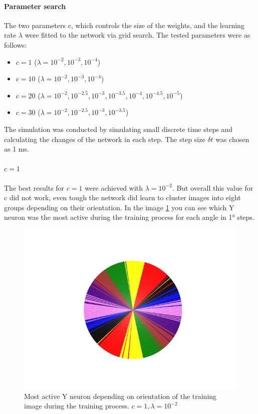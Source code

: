 \paragraph{Parameter search}
The two parameters c, which controls the size of the weights, and the learning rate $\lambda$ were fitted to the network via grid search.	The tested parameters were as follows:
\begin{itemize}
  \item $c = 1$ ($\lambda = 10^{-2}, 10^{-3}, 10^{-4}$) 
  \item $c = 10$ ($\lambda = 10^{-2}, 10^{-3}, 10^{-4}$) 
  \item $c = 20$ ($\lambda = 10^{-2}, 10^{-2.5}, 10^{-3}, 10^{-3.5},  10^{-4}, 10^{-4.5}, 10^{-5}$) 
  \item $c = 30$ ($\lambda = 10^{-2}, 10^{-2.5}, 10^{-3}, 10^{-3.5}$) 
\end{itemize}
The simulation was conducted by simulating small discrete time steps and calculating the changes of the network in each step. The step size $\delta t$ was chosen as 1 ms.

\paragraph{$c = 1$}
The best results for $c = 1$ were achieved with $\lambda = 10^{-2}$. But overall this value for c did not work, even tough the network did learn to cluster images into eight groups depending on their orientation. In the image \ref{fig:c1Pie} you can see which Y neuron was the most active during the training process for each angle in 1° steps.

\begin{figure}
  \includegraphics[width=\linewidth]{figures/angleNetwork/c1Pie.png}
  \caption{Most active Y neuron depending on orientation of the training image during the training process. $c = 1, \lambda = 10^{-2}$}
  \label{fig:c1Pie}
\end{figure}

